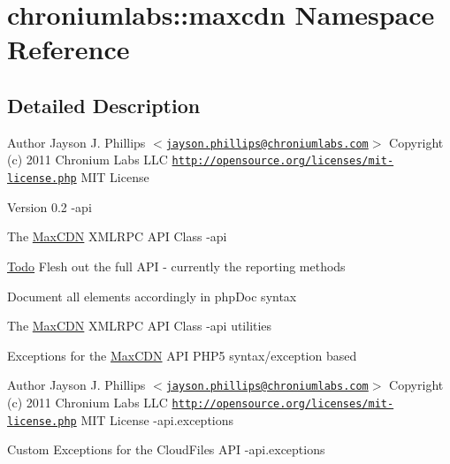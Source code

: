 \hypertarget{namespacechroniumlabs_1_1maxcdn}{
\section{chroniumlabs::maxcdn Namespace Reference}
\label{namespacechroniumlabs_1_1maxcdn}
}


\subsection{Detailed Description}
\begin{DoxyAuthor}{Author}
Jayson J. Phillips $<$\href{mailto:jayson.phillips@chroniumlabs.com}{\tt jayson.phillips@chroniumlabs.com}$>$  Copyright (c) 2011 Chronium Labs LLC  \href{http://opensource.org/licenses/mit-license.php}{\tt http://opensource.org/licenses/mit-\/license.php} MIT License 
\end{DoxyAuthor}
\begin{DoxyVersion}{Version}
0.2 -\/api
\end{DoxyVersion}
The \hyperlink{class_max_c_d_n}{MaxCDN} XMLRPC API Class -\/api \begin{Desc}
\item[\hyperlink{todo__todo000001}{Todo}]Flesh out the full API -\/ currently the reporting methods 

Document all elements accordingly in phpDoc syntax \end{Desc}


The \hyperlink{class_max_c_d_n}{MaxCDN} XMLRPC API Class -\/api  utilities

Exceptions for the \hyperlink{class_max_c_d_n}{MaxCDN} API PHP5 syntax/exception based

\begin{DoxyAuthor}{Author}
Jayson J. Phillips $<$\href{mailto:jayson.phillips@chroniumlabs.com}{\tt jayson.phillips@chroniumlabs.com}$>$  Copyright (c) 2011 Chronium Labs LLC  \href{http://opensource.org/licenses/mit-license.php}{\tt http://opensource.org/licenses/mit-\/license.php} MIT License -\/api.exceptions
\end{DoxyAuthor}
Custom Exceptions for the CloudFiles API -\/api.exceptions 
